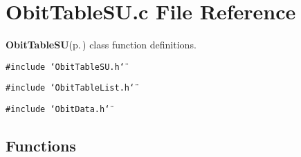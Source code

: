 \section{Obit\-Table\-SU.c File Reference}
\label{ObitTableSU_8c}
{\bf Obit\-Table\-SU}{\rm (p.\,\pageref{structObitTableSU})} class function definitions. 

{\tt \#include \char`\"{}Obit\-Table\-SU.h\char`\"{}}\par
{\tt \#include \char`\"{}Obit\-Table\-List.h\char`\"{}}\par
{\tt \#include \char`\"{}Obit\-Data.h\char`\"{}}\par
\subsection*{Functions}
